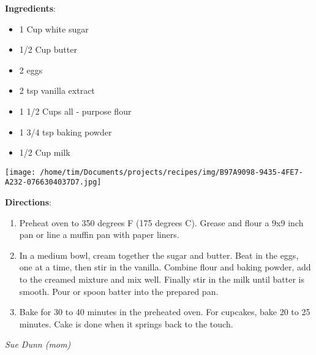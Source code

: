 \documentclass[11pt, twoside, openany]{book}
\begin{document}
\begin{minipage}[t]{0.8\linewidth}
\textbf{Ingredients}:\vspace{-3mm}
\begin{multicols}{2}
\begin{itemize}\setlength\itemsep{-1mm}
\item 1 Cup white sugar
\item 1/2 Cup butter
\item 2 eggs
\item 2 tsp vanilla extract
\item 1 1/2 Cups all - purpose flour
\item 1 3/4 tsp baking powder
\item 1/2 Cup milk
\end{itemize}
\end{multicols}
\end{minipage}
\begin{minipage}[t]{0.2\linewidth}
\centering \strut\vspace*{-\baselineskip}\newline
\texttt{[image: /home/tim/Documents/projects/recipes/img/B97A9098-9435-4FE7-A232-0766304037D7.jpg]}\\
\end{minipage}\vspace{3mm}
\textbf{Directions}:
\vspace{-3mm}\begin{enumerate}\setlength\itemsep{-1mm}
\item Preheat oven to 350 degrees F (175 degrees C). Grease and flour a 9x9 inch pan or line a muffin pan with paper liners.
\item In a medium bowl, cream together the sugar and butter. Beat in the eggs, one at a time, then stir in the vanilla. Combine flour and baking powder, add to the creamed mixture and mix well. Finally stir in the milk until batter is smooth. Pour or spoon batter into the prepared pan.
\item Bake for 30 to 40 minutes in the preheated oven. For cupcakes, bake 20 to 25 minutes. Cake is done when it springs back to the touch.
\end{enumerate}
 \label{chocolate-chip-cookies}\hfill\textit{Sue Dunn (mom)}\\
\end{document}
